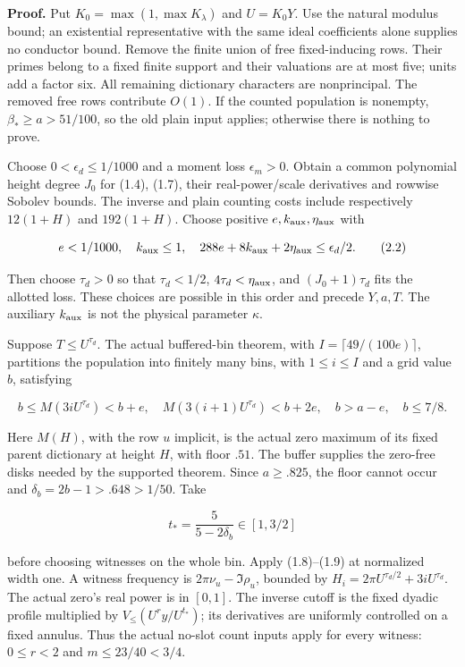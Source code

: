 \documentclass[11pt,a4paper]{article}
\begin{document}
\textbf{Proof.} Put \(K_0=\max(1,\max K_\lambda)\) and \(U=K_0Y\). Use
the natural modulus bound; an existential representative with the same
ideal coefficients alone supplies no conductor bound. Remove the finite
union of free fixed-inducing rows. Their primes belong to a fixed finite
support and their valuations are at most five; units add a factor six.
All remaining dictionary characters are nonprincipal. The removed free
rows contribute \(O(1)\). If the counted population is nonempty,
\(\beta_*\ge a>51/100\), so the old plain input applies; otherwise there
is nothing to prove.

Choose \(0<\epsilon_d\le1/1000\) and a moment loss \(\epsilon_m>0\).
Obtain a common polynomial height degree \(J_0\) for (1.4), (1.7), their
real-power/scale derivatives and rowwise Sobolev bounds. The inverse and
plain counting costs include respectively \(12(1+H)\) and \(192(1+H)\).
Choose positive \(e,k_{\rm aux},\eta_{\rm aux}\) with

\[
e<1/1000,\quad k_{\rm aux}\le1,\quad
288e+8k_{\rm aux}+2\eta_{\rm aux}\le\epsilon_d/2.
\tag{2.2}
\]

Then choose \(\tau_d>0\) so that \(\tau_d<1/2\),
\(4\tau_d<\eta_{\rm aux}\), and \((J_0+1)\tau_d\) fits the allotted
loss. These choices are possible in this order and precede \(Y,a,T\).
The auxiliary \(k_{\rm aux}\) is not the physical parameter \(\kappa\).

Suppose \(T\le U^{\tau_d}\). The actual buffered-bin theorem, with
\(I=\lceil49/(100e)\rceil\), partitions the population into finitely
many bins, with \(1\le i\le I\) and a grid value \(b\), satisfying

\[
b\le M(3iU^{\tau_d})<b+e,\quad
M(3(i+1)U^{\tau_d})<b+2e,\quad b>a-e,\quad b\le7/8.
\tag{2.3}
\]

Here \(M(H)\), with the row \(u\) implicit, is the actual zero maximum
of its fixed parent dictionary at height \(H\), with floor \(.51\). The
buffer supplies the zero-free disks needed by the supported theorem.
Since \(a\ge.825\), the floor cannot occur and
\(\delta_b=2b-1>.648>1/50\). Take

\[
t_*=\frac5{5-2\delta_b}\in[1,3/2]
\tag{2.4}
\]

before choosing witnesses on the whole bin. Apply (1.8)--(1.9) at
normalized width one. A witness frequency is \(2\pi\nu_u-\Im\rho_u\),
bounded by \(H_i=2\pi U^{\tau_d/2}+3iU^{\tau_d}\). The actual zero's
real power is in \([0,1]\). The inverse cutoff is the fixed dyadic
profile multiplied by \(V_{\le}(U^r y/U^{t_*})\); its derivatives are
uniformly controlled on a fixed annulus. Thus the actual no-slot count
inputs apply for every witness: \(0\le r<2\) and \(m\le23/40<3/4\).
\end{document}
